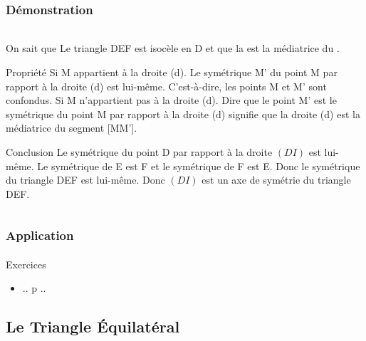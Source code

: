 \documentclass{beamer}
\begin{document}
\begin{frame}
\frametitle{Démonstration}  
\framesubtitle{}
	
\begin{columns}[c]
	
	
	\begin{column}{12cm}
		
		\begin{block}{On sait que}
			\small{Le triangle DEF est isocèle en D et que la  est la médiatrice du .}\pause
		\end{block}
		
		\begin{block}{Propriété}
			\small{Si M appartient à la droite (d).
			Le symétrique M' du point M par rapport à la droite (d) est lui-même.
			C'est-à-dire, les points M et M' sont confondus.
			Si M n'appartient pas à la droite (d).
			Dire que le point M' est le symétrique du point M par rapport à la droite (d) signifie que la droite (d) est la médiatrice du segment [MM'].}\pause
		\end{block}
		
		\begin{block}{Conclusion}
			\small{Le symétrique du point D par rapport à la droite $(DI)$ est lui-même.
			Le symétrique de E est F et le symétrique de F est E.
			Donc le symétrique du triangle DEF est lui-même.
			Donc $(DI)$ est un axe de symétrie du triangle DEF.}
		\end{block}
		
	\end{column}
	
	
\end{columns}
	
\end{frame}

\begin{frame}
	\frametitle{Application}  
	\framesubtitle{}
	
	\begin{block}{Exercices}
		\begin{itemize}
			\item .. p ..
		\end{itemize}
	\end{block}
\end{frame}

\subsection{Le Triangle Équilatéral}
\end{document}
